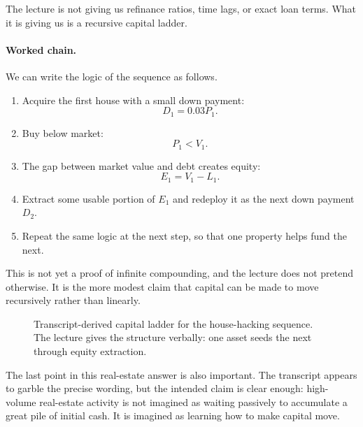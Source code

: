 The lecture is not giving us refinance ratios, time lags, or exact loan terms. What it is giving us is a recursive capital ladder.

\paragraph{Worked chain.}
We can write the logic of the sequence as follows.

\begin{enumerate}
\item Acquire the first house with a small down payment:
\[
D_1 = 0.03 P_1.
\]
\item Buy below market:
\[
P_1 < V_1.
\]
\item The gap between market value and debt creates equity:
\[
E_1 = V_1 - L_1.
\]
\item Extract some usable portion of \(E_1\) and redeploy it as the next down payment \(D_2\).
\item Repeat the same logic at the next step, so that one property helps fund the next.
\end{enumerate}

This is not yet a proof of infinite compounding, and the lecture does not pretend otherwise. It is the more modest claim that capital can be made to move recursively rather than linearly.

\begin{figure}
\centering
{}
\caption{Transcript-derived capital ladder for the house-hacking sequence. The lecture gives the structure verbally: one asset seeds the next through equity extraction.}
\end{figure}

The last point in this real-estate answer is also important. The transcript appears to garble the precise wording, but the intended claim is clear enough: high-volume real-estate activity is not imagined as waiting passively to accumulate a great pile of initial cash. It is imagined as learning how to make capital move.

